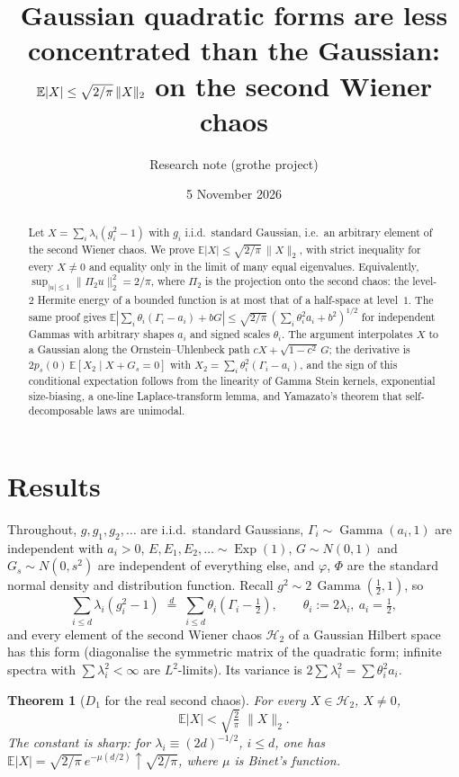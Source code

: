 \documentclass[11pt]{article}
\title{Gaussian quadratic forms are less concentrated than the Gaussian:\\
$\E|X|\le\sqrt{2/\pi}\,\|X\|_2$ on the second Wiener chaos}
\author{Research note (grothe project)}
\date{5 November 2026}
\newtheorem{theorem}{Theorem}[section]
\theoremstyle{remark}
\newcommand{\E}{\mathbb{E}}
\newcommand{\Exp}{\operatorname{Exp}}
\newcommand{\Gam}{\operatorname{Gamma}}
\newcommand{\Hil}{\mathcal H}
\begin{document}
\maketitle

\begin{abstract}
Let $X=\sum_{i}\lambda_i(g_i^2-1)$ with $g_i$ i.i.d.\ standard Gaussian, i.e.\ an arbitrary element of the second Wiener chaos.
We prove $\E|X|\le\sqrt{2/\pi}\,\|X\|_2$, with strict inequality for every $X\neq0$ and equality only in the limit of many equal
eigenvalues. Equivalently, $\sup_{|u|\le1}\|\Pi_2u\|_2^2=2/\pi$, where $\Pi_2$ is the projection onto the second chaos: the
level-$2$ Hermite energy of a bounded function is at most that of a half-space at level~$1$. The same proof gives
$\E|\sum_i\theta_i(\Gamma_i-a_i)+bG|\le\sqrt{2/\pi}\,(\sum_i\theta_i^2a_i+b^2)^{1/2}$ for independent Gammas with arbitrary shapes
$a_i$ and signed scales $\theta_i$. The argument interpolates $X$ to a Gaussian along the Ornstein--Uhlenbeck path
$cX+\sqrt{1-c^2}\,G$; the derivative is $2p_s(0)\,\E[X_2\mid X+G_s=0]$ with $X_2=\sum_i\theta_i^2(\Gamma_i-a_i)$, and the sign of
this conditional expectation follows from the linearity of Gamma Stein kernels, exponential size-biasing, a one-line Laplace-transform
lemma, and Yamazato's theorem that self-decomposable laws are unimodal.
\end{abstract}

\section{Results}

Throughout, $g,g_1,g_2,\dots$ are i.i.d.\ standard Gaussians, $\Gamma_i\sim\Gam(a_i,1)$ are independent with $a_i>0$,
$E,E_1,E_2,\dots\sim\Exp(1)$, $G\sim N(0,1)$ and $G_s\sim N(0,s^2)$ are independent of everything else, and
$\varphi$, $\Phi$ are the standard normal density and distribution function. Recall $g^2\sim 2\,\Gam(\tfrac12,1)$, so
\[
\sum_{i\le d}\lambda_i(g_i^2-1)\;\overset{d}{=}\;\sum_{i\le d}\theta_i(\Gamma_i-\tfrac12),\qquad \theta_i:=2\lambda_i,\ a_i=\tfrac12 ,
\]
and every element of the second Wiener chaos $\Hil_2$ of a Gaussian Hilbert space has this form (diagonalise the symmetric matrix of
the quadratic form; infinite spectra with $\sum\lambda_i^2<\infty$ are $L^2$-limits). Its variance is $2\sum\lambda_i^2=\sum\theta_i^2 a_i$.

\begin{theorem}[$D_1$ for the real second chaos]\label{thm:A}
For every $X\in\Hil_2$, $X\neq 0$,
\[
\E|X|<\sqrt{\tfrac{2}{\pi}}\;\|X\|_2 .
\]
The constant is sharp: for $\lambda_i\equiv(2d)^{-1/2}$, $i\le d$, one has $\E|X|=\sqrt{2/\pi}\,e^{-\mu(d/2)}\uparrow\sqrt{2/\pi}$,
where $\mu$ is Binet's function.
\end{theorem}
\end{document}
